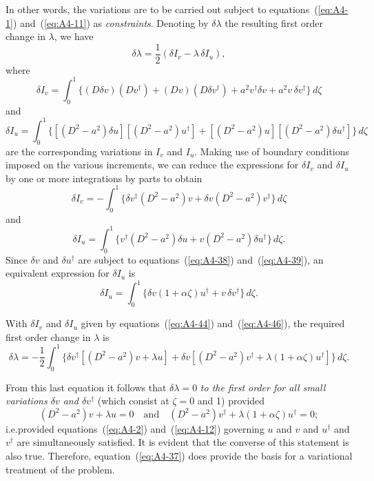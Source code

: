 In other words, the variations are to be carried out subject to equations~(\ref{eq:A4-1}) and~(\ref{eq:A4-11}) as \emph{constraints}.
Denoting by $\delta\lambda$ the resulting first order change in $\lambda$, we have
\begin{equation}
\label{eq:A4-41}
\delta\lambda = \frac{1}{2}(\delta I_v - \lambda \, \delta I_u),
\end{equation}
where
\begin{equation}
\label{eq:A4-42}
\delta I_v = \int_0^1 \{(D\delta v)(Dv^\dagger) + (Dv)(D\delta v^\dagger) + a^2 v^\dagger \delta v + a^2 v \, \delta v^\dagger\} \, d\zeta
\end{equation}
and
\begin{equation}
\label{eq:A4-43}
\delta I_u = \int_0^1 \{[(D^2 - a^2)\delta u][(D^2 - a^2)u^\dagger] + [(D^2 - a^2)u][(D^2 - a^2)\delta u^\dagger]\} \, d\zeta
\end{equation}
are the corresponding variations in $I_v$ and $I_u$. Making use of boundary
conditions imposed on the various increments, we can reduce the expressions for $\delta I_v$ and $\delta I_u$ by one or more integrations by parts to obtain
\begin{equation}
\label{eq:A4-44}
\delta I_v = -\int_0^1 \{\delta v^\dagger (D^2 - a^2)v + \delta v (D^2 - a^2)v^\dagger\} \, d\zeta
\end{equation}
and
\begin{equation}
\label{eq:A4-45}
\delta I_u = \int_0^1 \{v^\dagger (D^2 - a^2)\delta u + v (D^2 - a^2)\delta u^\dagger\} \, d\zeta.
\end{equation}
Since $\delta v$ and $\delta u^\dagger$ are subject to equations~(\ref{eq:A4-38}) and~(\ref{eq:A4-39}), an equivalent
expression for $\delta I_u$ is
\begin{equation}
\label{eq:A4-46}
\delta I_u = \int_0^1 \{\delta v (1 + \alpha\zeta)u^\dagger + v \, \delta v^\dagger\} \, d\zeta.
\end{equation}

With $\delta I_v$ and $\delta I_u$ given by equations~(\ref{eq:A4-44}) and~(\ref{eq:A4-46}), the required first
order change in $\lambda$ is
\begin{equation}
\label{eq:A4-47}
\delta\lambda = -\frac{1}{2}\int_0^1 \{\delta v^\dagger [(D^2 - a^2)v + \lambda u] + \delta v [(D^2 - a^2)v^\dagger + \lambda (1 + \alpha\zeta)u^\dagger]\} \, d\zeta.
\end{equation}

From this last equation it follows that $\delta\lambda = 0$ \emph{to the first order for all
small variations $\delta v$ and $\delta v^\dagger$} (which consist at $\zeta = 0$ and 1) provided
\begin{equation}
\label{eq:A4-48}
(D^2 - a^2)v + \lambda u = 0 \quad \text{and} \quad (D^2 - a^2)v^\dagger + \lambda (1 + \alpha\zeta)u^\dagger = 0;
\end{equation}
i.e.\@ provided equations~(\ref{eq:A4-2}) and~(\ref{eq:A4-12}) governing $u$ and $v$ and $u^\dagger$ and
$v^\dagger$ are simultaneously satisfied. It is evident that the converse of this
statement is also true. Therefore, equation~(\ref{eq:A4-37}) does provide the basis
for a variational treatment of the problem.

